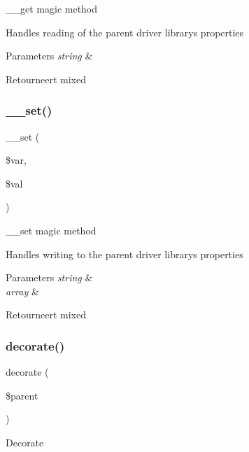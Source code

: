 \+\_\+\+\_\+get magic method

Handles reading of the parent driver library\textquotesingle{}s properties


\begin{DoxyParams}{Parameters}
{\em string} & \\
\hline
\end{DoxyParams}
\begin{DoxyReturn}{Retourneert}
mixed 
\end{DoxyReturn}
\mbox{\label{class_c_i___driver_a921783e9d7c3fb79479375193c9f3d1e}} 
\subsubsection{\texorpdfstring{\_\_set()}{\_\_set()}}
{\footnotesize\ttfamily \+\_\+\+\_\+set (\begin{DoxyParamCaption}\item[{}]{\$var,  }\item[{}]{\$val }\end{DoxyParamCaption})}

\+\_\+\+\_\+set magic method

Handles writing to the parent driver library\textquotesingle{}s properties


\begin{DoxyParams}{Parameters}
{\em string} & \\
\hline
{\em array} & \\
\hline
\end{DoxyParams}
\begin{DoxyReturn}{Retourneert}
mixed 
\end{DoxyReturn}
\mbox{\label{class_c_i___driver_acf6a5ad6a84d4c7a27f463cbb618004b}} 
\subsubsection{\texorpdfstring{decorate()}{decorate()}}
{\footnotesize\ttfamily decorate (\begin{DoxyParamCaption}\item[{}]{\$parent }\end{DoxyParamCaption})}

Decorate

